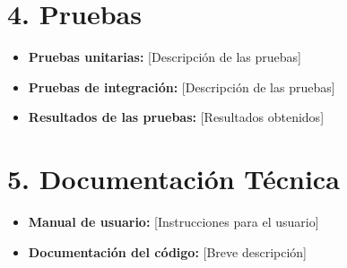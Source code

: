 \documentclass[12pt, a4paper]{article}
\begin{document}
\section*{4. Pruebas}
\begin{itemize}
    \item \textbf{Pruebas unitarias:} [Descripción de las pruebas]
    \item \textbf{Pruebas de integración:} [Descripción de las pruebas]
    \item \textbf{Resultados de las pruebas:} [Resultados obtenidos]
\end{itemize}

\section*{5. Documentación Técnica}
\begin{itemize}
    \item \textbf{Manual de usuario:} [Instrucciones para el usuario]
    \item \textbf{Documentación del código:} [Breve descripción]
\end{itemize}
\end{document}

